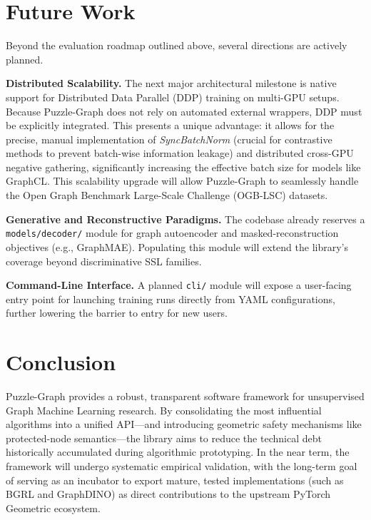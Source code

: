 \documentclass[conference]{IEEEtran}
\begin{document}
\section{Future Work}
Beyond the evaluation roadmap outlined above, several directions are actively planned.

\textbf{Distributed Scalability.} The next major architectural milestone is native support for Distributed Data Parallel (DDP) training on multi-GPU setups. Because Puzzle-Graph does not rely on automated external wrappers, DDP must be explicitly integrated. This presents a unique advantage: it allows for the precise, manual implementation of \textit{SyncBatchNorm} (crucial for contrastive methods to prevent batch-wise information leakage) and distributed cross-GPU negative gathering, significantly increasing the effective batch size for models like GraphCL. This scalability upgrade will allow Puzzle-Graph to seamlessly handle the Open Graph Benchmark Large-Scale Challenge (OGB-LSC) datasets.

\textbf{Generative and Reconstructive Paradigms.} The codebase already reserves a \texttt{models/decoder/} module for graph autoencoder and masked-reconstruction objectives (e.g., GraphMAE). Populating this module will extend the library's coverage beyond discriminative SSL families.

\textbf{Command-Line Interface.} A planned \texttt{cli/} module will expose a user-facing entry point for launching training runs directly from YAML configurations, further lowering the barrier to entry for new users.

\section{Conclusion}
Puzzle-Graph provides a robust, transparent software framework for unsupervised Graph Machine Learning research. By consolidating the most influential algorithms into a unified API---and introducing geometric safety mechanisms like protected-node semantics---the library aims to reduce the technical debt historically accumulated during algorithmic prototyping. In the near term, the framework will undergo systematic empirical validation, with the long-term goal of serving as an incubator to export mature, tested implementations (such as BGRL and GraphDINO) as direct contributions to the upstream PyTorch Geometric ecosystem.
\end{document}
